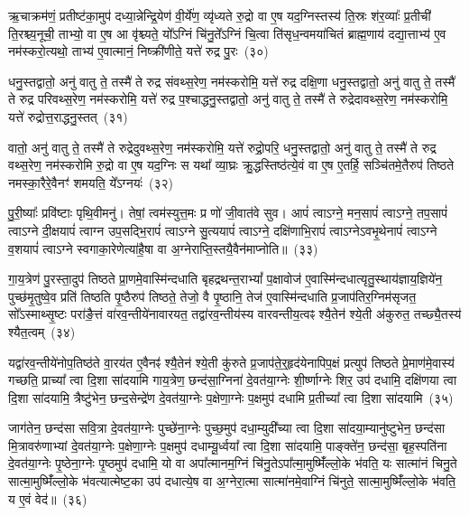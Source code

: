 ऋ॒चाक्रम॑णं॒ प्रतीष्ट॑का॒मुप॑ दध्या॒न्नेन्द्रि॒येण॑ वी॒र्ये॑ण॒ व्यृ॑ध्यते रु॒द्रो वा ए॒ष यद॒ग्निस्तस्य॑ ति॒स्रः श॑र॒व्याः᳚ प्र॒तीची॑ ति॒रश्च्य॒नूची॒ ताभ्यो॒ वा ए॒ष आ वृ॑श्च्यते॒ यो᳚\-ऽग्निं चि॑नु॒ते᳚\-ऽग्निं चि॒त्वा ति॑सृध॒न्वमया॑चितं ब्राह्म॒णाय॑ दद्या॒त्ताभ्य॑ ए॒व नम॑स्करो॒त्यथो॒ ताभ्य॑ ए॒वात्मानं॒ निष्क्री॑णीते॒ यत्ते॑ रुद्र पु॒रः~(३०)

धनु॒स्तद्वातो॒ अनु॑ वातु ते॒ तस्मै॑ ते रुद्र संवथ्स॒रेण॒ नम॑स्करोमि॒ यत्ते॑ रुद्र दक्षि॒णा धनु॒स्तद्वातो॒ अनु॑ वातु ते॒ तस्मै॑ ते रुद्र परिवथ्स॒रेण॒ नम॑स्करोमि॒ यत्ते॑ रुद्र प॒श्चाद्धनु॒स्तद्वातो॒ अनु॑ वातु ते॒ तस्मै॑ ते रुद्रेदावथ्स॒रेण॒ नम॑स्करोमि॒ यत्ते॑ रुद्रोत्त॒राद्धनु॒स्तत्~(३१)

वातो॒ अनु॑ वातु ते॒ तस्मै॑ ते रुद्रेदुवथ्स॒रेण॒ नम॑स्करोमि॒ यत्ते॑ रुद्रो॒परि॒ धनु॒स्तद्वातो॒ अनु॑ वातु ते॒ तस्मै॑ ते रुद्र वथ्स॒रेण॒ नम॑स्करोमि रु॒द्रो वा ए॒ष यद॒ग्निः स यथा᳚ व्या॒घ्रः क्रु॒द्धस्तिष्ठ॑त्ये॒वं वा ए॒ष ए॒तर्\mbox{}हि॒ सञ्चि॑तमे॒तैरुप॑ तिष्ठते नमस्का॒रैरे॒वैनꣳ॑ शमयति॒ ये᳚\-ऽग्नयः॑~(३२)

पु॒री॒ष्याः᳚ प्रवि॑ष्टाः पृथि॒वीमनु॑। तेषां॒ त्वम॑स्युत्त॒मः प्र णो॑ जी॒वात॑वे सुव। आपं॑ त्वा\-ऽग्ने॒ मन॒सापं॑ त्वा\-ऽग्ने॒ तप॒सापं॑ त्वाऽग्ने दी॒क्षयापं॑ त्वाग्न उप॒सद्भि॒रापं॑ त्वाऽग्ने सु॒त्ययापं॑ त्वा\-ऽग्ने॒ दक्षि॑णाभि॒रापं॑ त्वाऽग्ने\-ऽवभृ॒थेनापं॑ त्वाऽग्ने व॒शयापं॑ त्वाऽग्ने स्वगाका॒रेणेत्या॑है॒षा वा अ॒ग्नेराप्ति॒स्तयै॒वैन॑माप्नोति॥~(३३)

{\anuvakamend[{ऐ॒न्द्रि॒या पु॒र उ॑त्त॒राद्धनु॒स्तद॒ग्नय॑ आहा॒ष्टौ च॑}]}%

गा॒य॒त्रेण॑ पु॒रस्ता॒दुप॑ तिष्ठते प्रा॒णमे॒वास्मि॑न्दधाति बृहद्रथन्त॒रा\-भ्यां᳚ प॒क्षावोज॑ ए॒वास्मि॑न्दधात्यृतु॒स्थाय॑ज्ञाय॒ज्ञिये॑न॒ पुच्छ॑मृ॒तुष्वे॒व प्रति॑ तिष्ठति पृ॒ष्ठैरुप॑ तिष्ठते॒ तेजो॒ वै पृ॒ष्ठानि॒ तेज॑ ए॒वास्मि॑न्दधाति प्र॒जा\-प॑तिर॒ग्निम॑सृजत॒ सो᳚\-ऽस्माथ्सृ॒ष्टः परा॑ङै॒त्तं वा॑रव॒न्तीये॑नावारयत॒ तद्वा॑रव॒न्तीय॑स्य वारवन्तीय॒त्वꣴ श्यै॒तेन॑ श्ये॒ती अ॑कुरुत॒ तच्छ्यै॒तस्य॑ श्यैत॒त्वम्~(३४)

यद्वा॑रव॒न्तीये॑नोप॒तिष्ठ॑ते वा॒रय॑त ए॒वैनꣴ॑ श्यै॒तेन॑ श्ये॒ती कु॑रुते प्र॒जा\-प॑ते॒र्॒\mbox{}हृद॑येनापिप॒क्षं प्रत्युप॑ तिष्ठते प्रे॒माण॑मे॒वास्य॑ गच्छति॒ प्राच्या᳚ त्वा दि॒शा सा॑दयामि गाय॒त्रेण॒ छन्द॑सा॒ग्निना॑ दे॒वत॑या॒ग्नेः शी॒र्ष्णाग्नेः शिर॒ उप॑ दधामि॒ दक्षि॑णया त्वा दि॒शा सा॑दयामि॒ त्रैष्टु॑भेन॒ छन्द॒सेन्द्रे॑ण दे॒वत॑या॒ग्नेः प॒क्षेणा॒ग्नेः प॒क्षमुप॑ दधामि प्र॒तीच्या᳚ त्वा दि॒शा सा॑दयामि~(३५)

जाग॑तेन॒ छन्द॑सा सवि॒त्रा दे॒वत॑या॒ग्नेः पुच्छे॑ना॒ग्नेः पुच्छ॒मुप॑ दधा॒म्युदी᳚च्या त्वा दि॒शा सा॑दया॒म्यानु॑ष्टुभेन॒ छन्द॑सा मि॒त्रावरु॑णाभ्यां दे॒वत॑या॒ग्नेः प॒क्षेणा॒ग्नेः प॒क्षमुप॑ दधाम्यू॒र्ध्वया᳚ त्वा दि॒शा सा॑दयामि॒ पाङ्क्ते॑न॒ छन्द॑सा॒ बृह॒स्पति॑ना दे॒वत॑या॒ग्नेः पृ॒ष्ठेना॒ग्नेः पृ॒ष्ठमुप॑ दधामि॒ यो वा अपा᳚त्मानम॒ग्निं चि॑नु॒ते\-ऽपा᳚त्मा॒मुष्मिँ॑ल्लो॒के भ॑वति॒ यः सात्मा॑नं चिनु॒ते सात्मा॒मुष्मिँ॑ल्लो॒के भ॑वत्यात्मेष्ट॒का उप॑ दधात्ये॒ष वा अ॒ग्नेरा॒त्मा सात्मा॑नमे॒वाग्निं चि॑नुते॒ सात्मा॒मुष्मिँ॑ल्लो॒के भ॑वति॒ य ए॒वं वेद॑॥~(३६)


